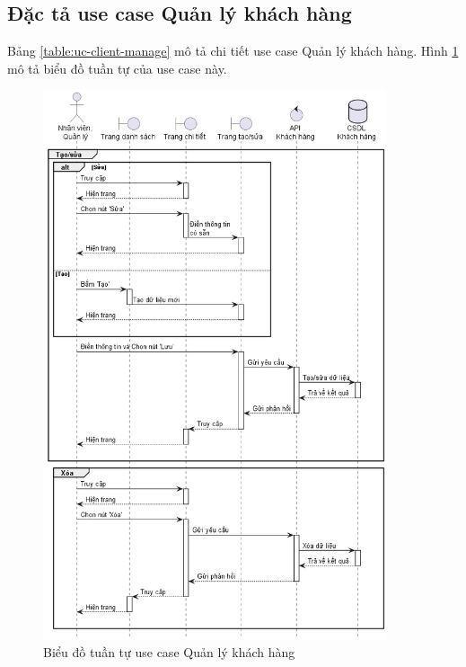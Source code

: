 \documentclass[../DoAn.tex]{subfiles}
\begin{document}
\subsection{Đặc tả use case Quản lý khách hàng}
\label{section:uc-client-manage}
Bảng \ref{table:uc-client-manage} mô tả chi tiết use case Quản lý khách hàng. Hình \ref{figure:sd-client-manage} mô tả biểu đồ tuần tự của use case này.
\begin{figure}[H]
    \centering
    \includegraphics[width=0.9\textwidth]{Hinhve/sequences/ClientManage.png}
    \caption{Biểu đồ tuần tự use case Quản lý khách hàng}
    \label{figure:sd-client-manage}
\end{figure}
\break
\end{document}
